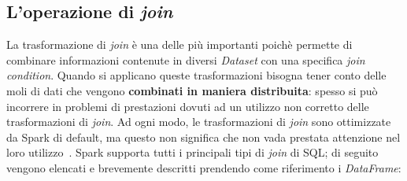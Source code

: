 \subsection{L'operazione di \textit{join}}\label{subsec:join}
La trasformazione di \textit{join} è una delle più importanti poichè permette di combinare informazioni contenute in diversi \textit{Dataset} con una specifica \textit{join condition}.
Quando si applicano queste trasformazioni bisogna tener conto delle moli di dati che vengono \textbf{combinati in maniera distribuita}:
spesso si può incorrere in problemi di prestazioni dovuti ad un utilizzo non corretto delle trasformazioni di \textit{join}.
Ad ogni modo, le trasformazioni di \textit{join} sono ottimizzate da Spark di default, ma questo non significa che non vada prestata attenzione nel loro utilizzo~\cite{spark-join}.
Spark supporta tutti i principali tipi di \textit{join} di SQL;
di seguito vengono elencati e brevemente descritti prendendo come riferimento i \textit{DataFrame}:
